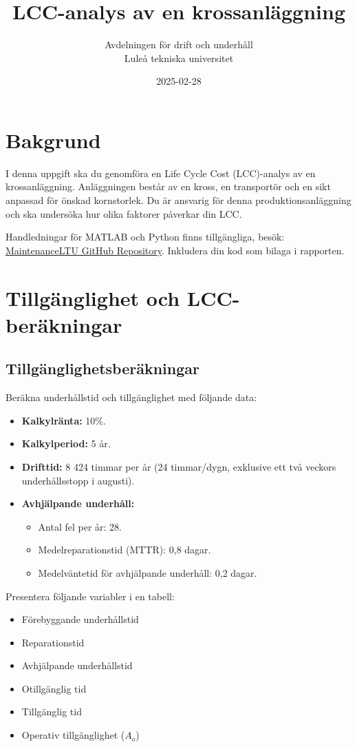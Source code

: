 \documentclass[a4paper,12pt]{exam}
\title{LCC-analys av en krossanläggning}
\author{Avdelningen för drift och underhåll \\
        Lule\aa{} tekniska universitet}
\date{2025-02-28}
\begin{document}
\maketitle

\section*{Bakgrund}
I denna uppgift ska du genomföra en Life Cycle Cost (LCC)-analys av en krossanläggning. Anläggningen består av en kross, en transportör och en sikt anpassad för önskad kornstorlek. Du är ansvarig för denna produktionsanläggning och ska undersöka hur olika faktorer påverkar din LCC.

Handledningar för MATLAB och Python finns tillgängliga, besök:  
\href{https://github.com/MaintenanceLTU/D0002B/tree/main/Maintenance%20Cost%20and%20LCC}{MaintenanceLTU GitHub Repository}. Inkludera din kod som bilaga i rapporten.

\section{Tillgänglighet och LCC-beräkningar}
\subsection{Tillgänglighetsberäkningar}
Beräkna underhållstid och tillgänglighet med följande data:
\begin{itemize}
    \item \textbf{Kalkylränta:} 10\%.
    \item \textbf{Kalkylperiod:} 5 år.
    \item \textbf{Drifttid:} 8 424 timmar per år (24 timmar/dygn, exklusive ett två veckors underhållsstopp i augusti).
    \item \textbf{Avhjälpande underhåll:}
    \begin{itemize}
        \item Antal fel per år: 28.
        \item Medelreparationstid (MTTR): 0,8 dagar.
        \item Medelväntetid för avhjälpande underhåll: 0,2 dagar.
    \end{itemize}
\end{itemize}
Presentera följande variabler i en tabell: 
\begin{itemize}
    \item Förebyggande underhållstid
    \item Reparationstid
    \item Avhjälpande underhållstid
    \item Otillgänglig tid
    \item Tillgänglig tid
    \item Operativ tillgänglighet ($A_o$)
\end{itemize}
\end{document}
